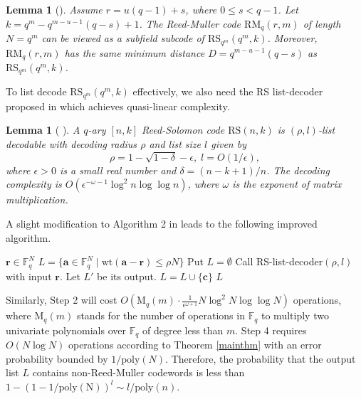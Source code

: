 \documentclass[a4paper, 10pt]{article}
\newtheorem{lemma}[theorem]{Lemma}      %
\begin{document}
\begin{lemma}[\cite{11197050}]
    Assume $r=u(q-1)+s$, where $0\le s<q-1$. Let $k=q^m-q^{m-u-1}(q-s)+1$. The Reed-Muller code $\mathrm{RM}_q(r,m)$ of length $N=q^m$ can be viewed as a subfield subcode of $\mathrm{RS}_{q^m}(q^m,k)$. Moreover, $\mathrm{RM}_q(r,m)$ has the same minimum distance $D=q^{m-u-1}(q-s)$ as $\mathrm{RS}_{q^m}(q^m,k)$.
\end{lemma}
To list decode $\mathrm{RS}_{q^m}(q^m,k)$ effectively, we also need the RS list-decoder proposed in \cite{Cohn2015} which achieves quasi-linear complexity.
\begin{lemma}[\cite{Cohn2015} \cite{11197050}]
    A $q$-ary $[n,k]$ Reed-Solomon code $\mathrm{RS}(n,k)$ is $(\rho,l)$-list decodable with decoding radius $\rho$ and list size $l$ given by
    \[
    \rho=1-\sqrt{1-\delta}-\epsilon,\;l=O(1/\epsilon),
    \]
    where $\epsilon>0$ is a small real number and $\delta = (n-k+1)/n$. The decoding complexity is $O(\epsilon^{-\omega-1}\log^2 n\log\log n)$, where $\omega$ is the exponent of matrix multiplication.
\end{lemma}
A slight modification to Algorithm 2 in \cite{11197050} leads to the following improved algorithm.
\begin{algorithm}[H]
\caption{RM-list-Decoder($\rho,l$)}
\begin{algorithmic}[1]
\Require $\mathbf{r}\in \mathbb{F}_q^N$
\Ensure $L=\{\mathbf{a}\in \mathbb{F}_q^N\;|\; \mathrm{wt}(\mathbf{a}-\mathbf{r})\le \rho N\}$
\State Put $L=\emptyset$
\State Call RS-list-decoder$(\rho,l)$ with input $\mathbf{r}$. Let $L'$ be its output.
        \State $L=L\cup \{\mathbf{c}\}$
    \EndIf
\EndFor
\State \Return $L$
\end{algorithmic}
\end{algorithm}
Similarly, Step 2 will cost $O(\mathrm{M}_q(m)\cdot \frac{1}{\epsilon^{\omega+1}}N\log^2N\log\log N )$ operations, where $\mathrm{M}_q(m)$ stands for the number of operations in $\mathbb{F}_q$ to multiply two univariate polynomials over $\mathbb{F}_q$ of degree less than $m$. Step 4 requires $O(N\log N)$ operations according to Theorem \ref{mainthm} with an error probability bounded by $1/\mathrm{poly}(N)$. Therefore, the probability that the output list $L$ contains non-Reed-Muller codewords is less than $1-(1-1/\mathrm{poly(N)})^l\sim  l/\mathrm{poly}(n)$.
\end{document}
